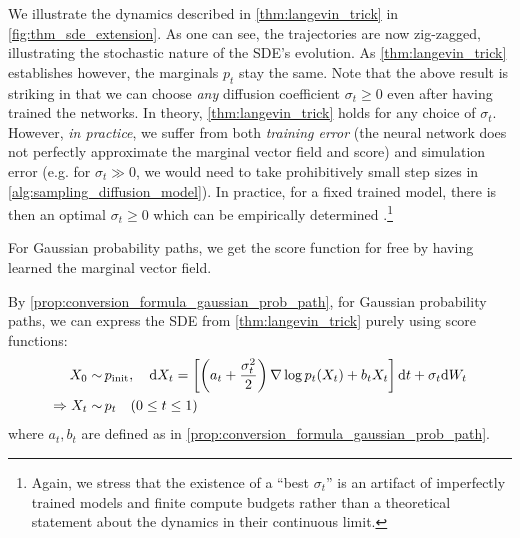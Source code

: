 We illustrate the dynamics described in \cref{thm:langevin_trick} in \cref{fig:thm_sde_extension}. As one can see, the trajectories are now zig-zagged, illustrating the stochastic nature of the SDE's evolution. As \cref{thm:langevin_trick} establishes however, the marginals $p_t$ stay the same. Note that the above result is striking in that we can choose \emph{any} diffusion coefficient $\sigma_{t}\geq 0$ even after having trained the networks. In theory, \cref{thm:langevin_trick} holds for any choice of $\sigma_t$. However, \emph{in practice}, we suffer from both \textit{training error} (the neural network does not perfectly approximate the marginal vector field and score) and simulation error (e.g. for $\sigma_{t}\gg0$, we would need to take prohibitively small step sizes in \cref{alg:sampling_diffusion_model}). In practice, for a fixed trained model, there is then an optimal $\sigma_{t}\geq 0$ which can be empirically determined \citep{karras2022elucidating, albergo2023stochastic, ma2024sit}.\footnote{Again, we stress that the existence of a ``best $\sigma_t$'' is an artifact of imperfectly trained models and finite compute budgets rather than a theoretical statement about the dynamics in their continuous limit.}

For Gaussian probability paths, we get the score function for free by having learned the marginal vector field. 
\begin{examplebox}
    By \cref{prop:conversion_formula_gaussian_prob_path}, for Gaussian probability paths, we can express the SDE from \cref{thm:langevin_trick} purely using score functions:
\begin{align}
\label{eq:sde_extension_gaussian}
    X_0\sim&\,p_{\rm{init}},\quad \mathrm{d} X_t =\left[\left(a_t+\frac{\sigma_t^2}{2}\right)\nabla\log p_t(X_t)+b_tX_t\right]\mathrm{d} t +\sigma_t\mathrm{d} W_t\\
\label{eq:marginal_ode_follows_marginal_path_sde_gaussian}
    \Rightarrow X_t\sim& \,p_t\quad (0\leq t\leq 1)
\end{align}
where $a_t,b_t$ are defined as in \cref{prop:conversion_formula_gaussian_prob_path}.
\end{examplebox}



